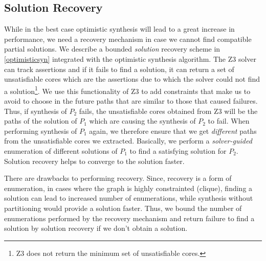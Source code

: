 \subsection{Solution Recovery}
While in the best case optimistic synthesis  will lead to a great
increase in performance, we need a recovery mechanism in case we cannot find
compatible partial solutions.  We describe a bounded \emph{solution} recovery
scheme in \cref{optimisticsyn}  integrated with the optimistic
synthesis algorithm.  The Z3 solver can track assertions and if it
fails to find a solution, it can return a set of unsatisfiable cores
which are the assertions due to which the solver could not find a
solution\footnote{Z3 does not return the minimum set of unsatisfiable
  cores.}.  We use this functionality of Z3 
to add constraints that make us to avoid to choose in the future
paths that are similar to those that caused failures.
Thus, if synthesis of $P_2$ fails, the unsatisfiable cores
obtained from Z3 will be the paths of the solution of $P_1$ which are
causing the synthesis of $P_2$ to fail. 
When performing synthesis of $P_1$
again, we therefore ensure that we get \emph{different} paths from the
unsatisfiable cores we extracted.  Basically, we perform a 
\emph{solver-guided} enumeration of different solutions of $P_1$ to
find a satisfying solution for $P_2$.  Solution recovery helps to
converge to the solution faster. 

There are drawbacks to performing recovery. Since, recovery is a 
form of enumeration, in cases where the graph is highly constrainted
(clique), finding a solution can lead to increased number of enumerations,
while synthesis without partitioning would provide a solution faster. 
Thus, we bound the number of enumerations performed by the 
recovery mechanism and return failure to find a solution by solution recovery
if we don't obtain a solution. 


